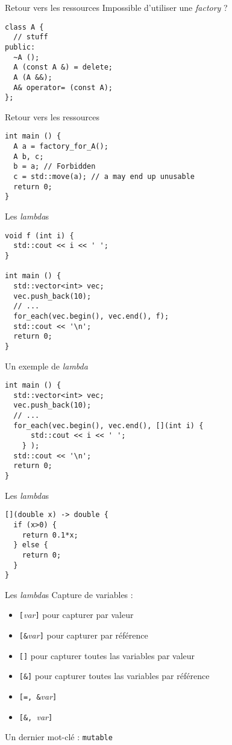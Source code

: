 \begin{frame}[fragile]{Retour vers les ressources}
  Impossible d'utiliser une \textit{factory} ?
  
  \begin{lstlisting}
class A {
  // stuff
public:
  ~A ();
  A (const A &) = delete;
  A (A &&);
  A& operator= (const A);
};
  \end{lstlisting}
\end{frame}

\begin{frame}[fragile]{Retour vers les ressources}
  \begin{lstlisting}
int main () {
  A a = factory_for_A();
  A b, c;
  b = a; // Forbidden
  c = std::move(a); // a may end up unusable
  return 0;
}
  \end{lstlisting}
\end{frame}

\begin{frame}[fragile]{Les \textit{lambda}s}
  \begin{lstlisting}
void f (int i) {
  std::cout << i << ' ';
}

int main () {
  std::vector<int> vec;
  vec.push_back(10);
  // ...
  for_each(vec.begin(), vec.end(), f);
  std::cout << '\n';
  return 0;
}
  \end{lstlisting}
\end{frame}

\begin{frame}[fragile]{Un exemple de \textit{lambda}}
  \begin{lstlisting}
int main () {
  std::vector<int> vec;
  vec.push_back(10);
  // ...
  for_each(vec.begin(), vec.end(), [](int i) {
      std::cout << i << ' ';
    } );
  std::cout << '\n';
  return 0;
}
  \end{lstlisting}
\end{frame}

\begin{frame}[fragile]{{Les \textit{lambda}s}}
  \begin{lstlisting}
[](double x) -> double {
  if (x>0) {
    return 0.1*x;
  } else {
    return 0;
  }
}
  \end{lstlisting}
\end{frame}

\begin{frame}[fragile]{{Les \textit{lambda}s}}
  Capture de variables :
  \begin{itemize}
  \item \texttt{[}\textit{var}\texttt{]} pour capturer par valeur
  \item \texttt{[\&}\textit{var}\texttt{]} pour capturer par référence
  \item \texttt{[]} pour capturer toutes las variables par valeur
  \item \texttt{[\&]} pour capturer toutes las variables par référence
  \item \texttt{[=, \&}\textit{var}\texttt{]}
  \item \texttt{[\&, }\textit{var}\texttt{]}
  \end{itemize}

  Un dernier mot-clé : \texttt{mutable}
\end{frame}
